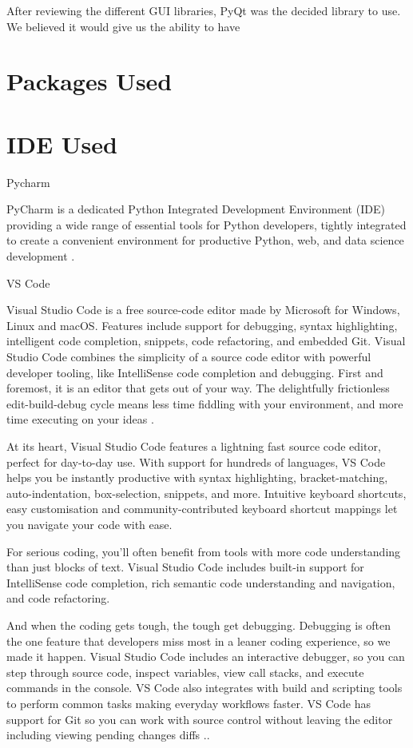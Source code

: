 	After reviewing the different GUI libraries, PyQt was the decided library to use. We believed it would give us the ability to have 
	
	
	\section{Packages Used}
	\label{sec:packages_used}
	
	
	\section{IDE Used}
	\label{sec:ide_used}
	
	Pycharm
	
	PyCharm is a dedicated Python Integrated Development Environment (IDE) providing a wide range of essential tools for Python developers, tightly integrated to create a convenient environment for productive Python, web, and data science development \cite{pycharm_get_started}.
	
	VS Code
	
	Visual Studio Code is a free source-code editor made by Microsoft for Windows, Linux and macOS. Features include support for debugging, syntax highlighting, intelligent code completion, snippets, code refactoring, and embedded Git. Visual Studio Code combines the simplicity of a source code editor with powerful developer tooling, like IntelliSense code completion and debugging. First and foremost, it is an editor that gets out of your way. The delightfully frictionless edit-build-debug cycle means less time fiddling with your environment, and more time executing on your ideas \cite{vs_code}.
	
	At its heart, Visual Studio Code features a lightning fast source code editor, perfect for day-to-day use. With support for hundreds of languages, VS Code helps you be instantly productive with syntax highlighting, bracket-matching, auto-indentation, box-selection, snippets, and more. Intuitive keyboard shortcuts, easy customisation and community-contributed keyboard shortcut mappings let you navigate your code with ease.
	
	For serious coding, you'll often benefit from tools with more code understanding than just blocks of text. Visual Studio Code includes built-in support for IntelliSense code completion, rich semantic code understanding and navigation, and code refactoring.
	
	And when the coding gets tough, the tough get debugging. Debugging is often the one feature that developers miss most in a leaner coding experience, so we made it happen. Visual Studio Code includes an interactive debugger, so you can step through source code, inspect variables, view call stacks, and execute commands in the console.
	VS Code also integrates with build and scripting tools to perform common tasks making everyday workflows faster. VS Code has support for Git so you can work with source control without leaving the editor including viewing pending changes diffs \cite{vs_code}..
	
